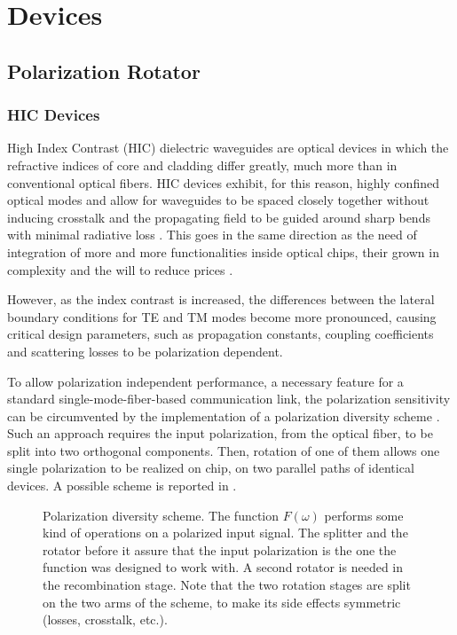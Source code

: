 \part{Devices}

\chapter{Polarization Rotator}

\section{HIC Devices}

High Index Contrast (HIC) dielectric waveguides are optical devices in
which the refractive indices of core and cladding differ greatly, much
more than in conventional optical fibers. HIC devices exhibit, for
this reason, highly confined optical modes and allow for waveguides to
be spaced closely together without inducing crosstalk and the
propagating field to be guided around sharp bends with minimal
radiative loss \cite{watts_integrated}. This goes in the same
direction as the need of integration of more and more functionalities
inside optical chips, their grown in complexity and the will to reduce
prices \cite{exp_pirelli}.

However, as the index contrast is increased, the differences between
the lateral boundary conditions for TE and TM modes become more
pronounced, causing critical design parameters, such as propagation
constants, coupling coefficients and scattering losses to be
polarization dependent.

To allow polarization independent performance, a necessary feature for
a standard single-mode-fiber-based communication link, the
polarization sensitivity can be circumvented by the implementation of
a polarization diversity scheme \cite{madsen_optical}. Such an
approach requires the input polarization, from the optical fiber, to
be split into two orthogonal components. Then, rotation of one of them
allows one single polarization to be realized on chip, on two parallel
paths of identical devices. A possible scheme is reported in
.

\begin{figure}[htbp]
  \begin{center}
    \resizebox{12cm}{!}{}
  \end{center}
  \caption{Polarization diversity scheme. The function $F(\omega)$
    performs some kind of operations on a polarized input signal. The
    splitter and the rotator before it assure that the input
    polarization is the one the function was designed to work with. A
    second rotator is needed in the recombination stage. Note that the
    two rotation stages are split on the two arms of the scheme, to
    make its side effects symmetric (losses, crosstalk, etc.).}
  \label{fig:exp_fig1}
\end{figure}

